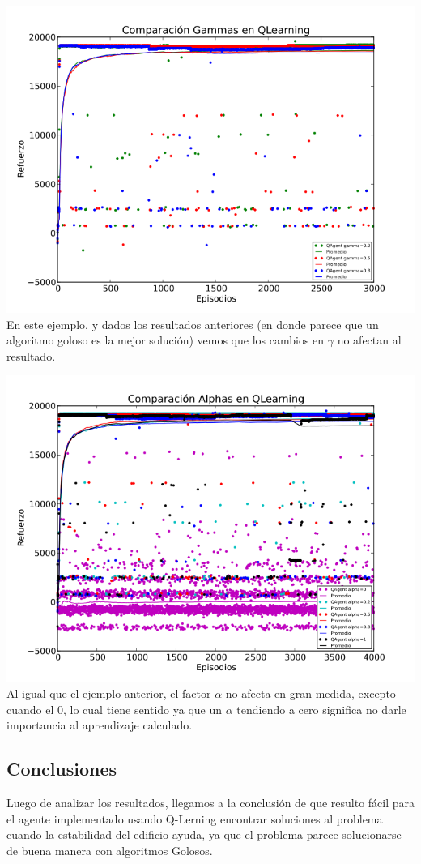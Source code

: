 \documentclass[11pt, a4paper]{article}
\begin{document}
\includegraphics[scale=0.6]{Graficos/gammasQ}
En este ejemplo, y dados los resultados anteriores (en donde parece que un algoritmo goloso es la mejor soluci\'on) vemos que los cambios en $\gamma$ no afectan al resultado.

\includegraphics[scale=0.6]{Graficos/alphasQ}
Al igual que el ejemplo anterior, el factor $\alpha$  no afecta en gran medida, excepto cuando el 0, lo cual tiene sentido ya que un $\alpha$ tendiendo a cero significa no darle importancia al aprendizaje calculado. 

\subsection{Conclusiones}
Luego de analizar los resultados, llegamos a la conclusi\'on de que resulto f\'acil para el agente implementado usando Q-Lerning encontrar soluciones al problema cuando la estabilidad del edificio ayuda, ya que el problema parece solucionarse de buena manera con algoritmos Golosos. 
\end{document}
